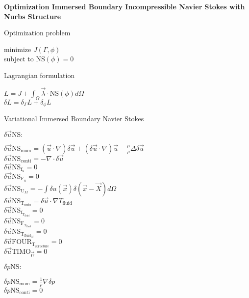 \documentclass[10pt]{article} %
\begin{document}
\newpage
\begin{center}
	\textbf{Optimization Immersed Boundary Incompressible Navier Stokes with Nurbs Structure}
\begin{flushleft}
	Optimization problem
\end{flushleft}	
	minimize $J(\Gamma,\phi)$\\
	subject to $\text{NS}(\phi) = 0$
\begin{flushleft}
	Lagrangian formulation
\end{flushleft}	
	$L = J + \int_{\Omega} \vec{\lambda} \cdot \text{NS}(\phi)  d\Omega$\\
	$\delta L = \delta_\Gamma L + \delta_\phi L$\\
\begin{flushleft}
	Variational Immersed Boundary Navier Stokes
\end{flushleft}
\begin{flushleft}
	$\delta \vec{u} \text{NS}:$
\end{flushleft}
	$\delta \vec{u} \text{NS}_{\text{mom}} = (\vec{u}\cdot\nabla) \delta{\vec{u}} + (\delta{\vec{u}}\cdot\nabla)\vec{u}-\frac{\mu}{\rho} \Delta \delta{\vec{u}}$\\
	$\delta \vec{u} \text{NS}_{\text{conti}} = - \nabla \cdot \delta\vec{u}$\\
	$\delta \vec{u} \text{NS}_{\text{f}_u} = 0$\\
	$\delta \vec{u} \text{NS}_{\text{F}_u} = 0$\\
	$\delta \vec{u} \text{NS}_{\text{U}_M} =  - \int \delta u(\vec{x}) \delta(\vec{x}-\vec{X}) d \Omega$\\
	$\delta \vec{u} \text{NS}_{\text{T}_{\text{fluid}}} = \delta\vec{u} \cdot \nabla T_{\text{fluid}}$\\
	$\delta \vec{u} \text{NS}_{\text{f}_{\text{T}_{\text{fluid}}}} = 0$\\
	$\delta \vec{u} \text{NS}_{\text{F}_{\text{T}_{\text{fluid}}}} = 0$\\
	$\delta \vec{u} \text{NS}_{\text{T}_{\text{fluid}_M}} = 0$\\
	$\delta \vec{u} \text{FOUR}_{\text{T}_{\text{structure}}} = 0$\\
	$\delta \vec{u} \text{TIMO}_{\vec{U}} = 0$\\
\begin{flushleft}
	$\delta p \text{NS}:$
\end{flushleft}
	$\delta p \text{NS}_{\text{mom}} =  \frac{1}{\rho} \nabla \delta p$\\
	$\delta p \text{NS}_{\text{conti}} = 0$\\

\end{center}
\end{document}
